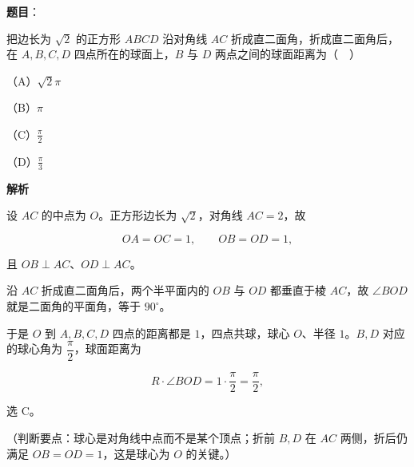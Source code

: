 \begin{answer}

\textbf{题目}：

把边长为 $\sqrt2$ 的正方形 $ABCD$ 沿对角线 $AC$ 折成直二面角，折成直二面角后，在 $A,B,C,D$ 四点所在的球面上，$B$ 与 $D$ 两点之间的球面距离为（　）

（A）$\sqrt2\pi$

（B）$\pi$

（C）$\frac{\pi}{2}$

（D）$\frac{\pi}{3}$

\textbf{解析}

设 $AC$ 的中点为 $O$。正方形边长为 $\sqrt2$，对角线 $AC=2$，故

\nopagebreak[4]
\[OA=OC=1,\qquad OB=OD=1,\]

且 $OB\perp AC$、$OD\perp AC$。

沿 $AC$ 折成直二面角后，两个半平面内的 $OB$ 与 $OD$ 都垂直于棱 $AC$，故 $\angle BOD$ 就是二面角的平面角，等于 $90^\circ$。

于是 $O$ 到 $A,B,C,D$ 四点的距离都是 $1$，四点共球，球心 $O$、半径 $1$。$B,D$ 对应的球心角为 $\dfrac{\pi}{2}$，球面距离为

\nopagebreak[4]
\[R\cdot\angle BOD=1\cdot\frac{\pi}{2}=\frac{\pi}{2},\]

选 C。

（判断要点：球心是对角线中点而不是某个顶点；折前 $B,D$ 在 $AC$ 两侧，折后仍满足 $OB=OD=1$，这是球心为 $O$ 的关键。）


\end{answer}
